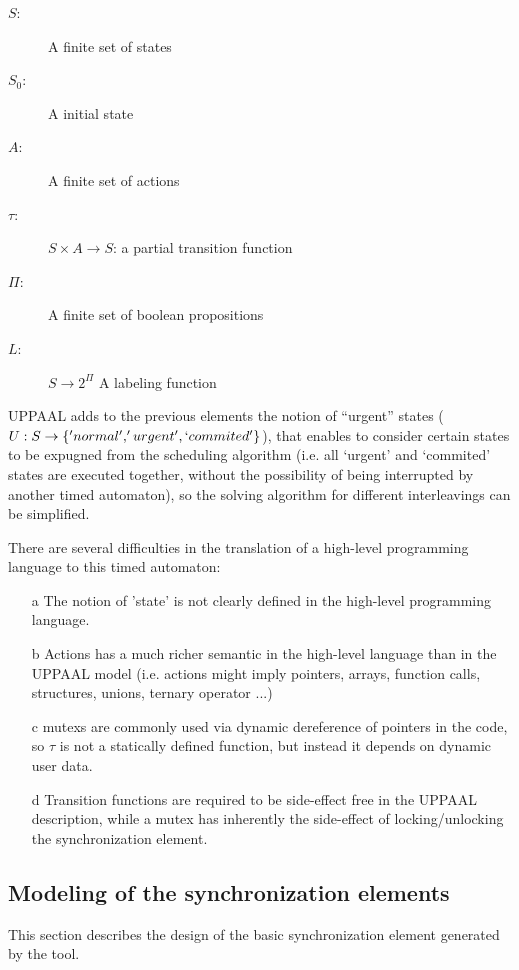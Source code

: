 \documentclass[conference]{IEEEtran}
\begin{document}
\begin{description}
    \item [$S$: ] A finite set of states
    \item[$S_0$:] A initial state
    \item[$A$:  ] A finite set of actions
    \item[$\tau$:] $S \times A \rightarrow S$: a partial transition function
    \item[$\Pi$:] A finite set of boolean propositions
    \item[$L$:] $S \rightarrow 2^\Pi$ A labeling function
\end{description}


UPPAAL adds to the previous elements the notion of ``urgent'' states ($U: S \rightarrow \{'normal', 'urgent', `commited'\}$), that enables to consider certain states to be expugned from the scheduling algorithm (i.e. all `urgent' and `commited' states are executed together, without the possibility of being interrupted by another timed automaton), so the solving algorithm for different interleavings can be simplified.

There are several difficulties in the translation of a high-level programming language to this timed automaton:

\begin{itemize}
    \item [a] The notion of 'state' is not clearly defined in the high-level programming language.
    \item [b] Actions has a much richer semantic in the high-level language than in the UPPAAL model (i.e. actions might imply pointers, arrays, function calls, structures, unions, ternary operator ...)
    \item [c] mutexs are commonly used via dynamic dereference of pointers in the code, so $\tau$ is not a statically defined function, but instead it depends on dynamic user data.
    \item [d] Transition functions are required to be side-effect free in the UPPAAL description, while a mutex has inherently the side-effect of locking/unlocking the synchronization element.
\end{itemize}

\subsection{Modeling of the synchronization elements}

This section describes the design of the basic synchronization element generated by the tool. 
\end{document}
